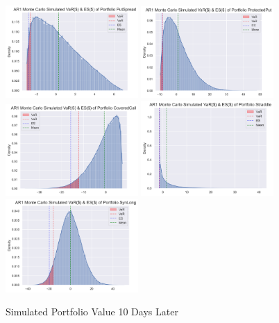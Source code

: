 \documentclass[11pt,en]{elegantpaper}
\begin{document}
\begin{figure}[htbp] 
    \centering 
    \includegraphics[width=0.45\textwidth]{./image/image_3/Simulation/PutSpread.png} 
    \includegraphics[width=0.45\textwidth]{./image/image_3/Simulation/ProtectedPut.png} 
    \includegraphics[width=0.45\textwidth]{./image/image_3/Simulation/CoveredCall.png} 
    \includegraphics[width=0.45\textwidth]{./image/image_3/Simulation/Straddle.png} 
    \includegraphics[width=0.45\textwidth]{./image/image_3/Simulation/SynLong.png} 
    \caption{Simulated Portfolio Value 10 Days Later}
\end{figure}
\end{document}

